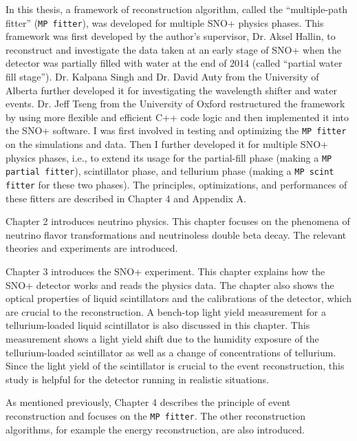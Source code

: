 In this thesis, a framework of reconstruction algorithm, called the ``multiple-path fitter'' (\texttt{MP fitter}), was developed for multiple SNO+ physics phases. This framework was first developed by the author's supervisor, Dr. Aksel Hallin, to reconstruct and investigate the data taken at an early stage of SNO+ when the detector was partially filled with water at the end of 2014 (called ``partial water fill stage'')\cite{partialWater}. Dr. Kalpana Singh and Dr. David Auty from the University of Alberta further developed it for investigating the wavelength shifter and water events\cite{davidPartialWater, kalpanaWLS, kalpanaWLS2, kalpanaMPFitter}. Dr. Jeff Tseng from the University of Oxford restructured the framework by using more flexible and efficient C++ code logic and then implemented it into the SNO+ software\cite{jieMPW}.  I was first involved in testing and optimizing the \texttt{MP fitter} on the simulations and data. Then I further developed it for multiple SNO+ physics phases, i.e., to extend its usage for the partial-fill phase (making a \texttt{MP partial fitter}), scintillator phase, and tellurium phase (making a \texttt{MP scint fitter} for these two phases). The principles, optimizations, and performances of these fitters are described in Chapter 4 and Appendix A.

Chapter 2 introduces neutrino physics. This chapter focuses on the phenomena of neutrino flavor transformations and neutrinoless double beta decay. The relevant theories and experiments are introduced.

Chapter 3 introduces the SNO+ experiment. This chapter explains how the SNO+ detector works and reads the physics data. The chapter also shows the optical properties of liquid scintillators and the calibrations of the detector, which are crucial to the reconstruction. A bench-top light yield measurement for a tellurium-loaded liquid scintillator is also discussed in this chapter. This measurement shows a light yield shift due to the humidity exposure of the tellurium-loaded scintillator as well as a change of concentrations of tellurium. Since the light yield of the scintillator is crucial to the event reconstruction, this study is helpful for the detector running in realistic situations.

As mentioned previously, Chapter 4 describes the principle of event reconstruction and focuses on the \texttt{MP fitter}. The other reconstruction algorithms, for example the energy reconstruction, are also introduced. 

